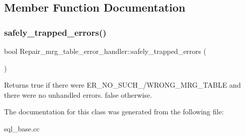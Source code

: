 \subsection{Member Function Documentation}
\mbox{\label{classRepair__mrg__table__error__handler_afd9ca32003181b96c40dbfff28c0fbf6}} 
\subsubsection{\texorpdfstring{safely\+\_\+trapped\+\_\+errors()}{safely\_trapped\_errors()}}
{\footnotesize\ttfamily bool Repair\+\_\+mrg\+\_\+table\+\_\+error\+\_\+handler\+::safely\+\_\+trapped\+\_\+errors (\begin{DoxyParamCaption}{ }\end{DoxyParamCaption})\hspace{0.3cm}{\ttfamily [inline]}}

Returns true if there were E\+R\+\_\+\+N\+O\+\_\+\+S\+U\+C\+H\+\_\+/\+W\+R\+O\+N\+G\+\_\+\+M\+R\+G\+\_\+\+T\+A\+B\+LE and there were no unhandled errors. false otherwise. 

The documentation for this class was generated from the following file\+:\begin{DoxyCompactItemize}
\item 
sql\+\_\+base.\+cc\end{DoxyCompactItemize}
